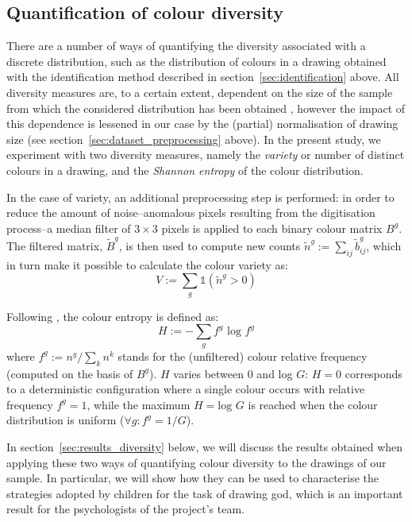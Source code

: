 \documentclass[11pt,a4paper]{article}
\begin{document}
\subsection{Quantification of colour diversity}
\label{sec:diversity}

There are a number of ways of quantifying the diversity associated with a discrete distribution, such as the distribution of colours in a drawing obtained with the identification method described in section~\ref{sec:identification} above. All diversity measures are, to a certain extent, dependent on the size of the sample from which the considered distribution has been obtained \cite[see e.g.][]{TweedieBaayen1998}, however the impact of this dependence is lessened in our case by the (partial) normalisation of drawing size (see section~\ref{sec:dataset_preprocessing} above). In the present study, we experiment with two diversity measures, namely the {\em variety} or number of distinct colours in a drawing, and the {\em Shannon entropy} of the colour distribution.

In the case of variety, an additional preprocessing step is performed: in order to reduce the amount of noise--anomalous pixels resulting from the digitisation process--a median filter of \(3 \times 3\) pixels is applied to each binary colour matrix $B^{g}$. The filtered matrix, $\tilde{B}^{g}$, is then used to compute new counts $\tilde{n}^{g} := \sum_{ij}\tilde{b}_{ij}^{g}$, which in turn make it possible to calculate the colour variety as:
\begin{equation}
	V := \sum_{g}\mathds{1}(\tilde{n}^{g} > 0)
\end{equation}

Following \citet{Shannon1948}, the colour entropy is defined as:
\begin{equation}
	H := -\sum_{g} f^{g}\mbox{ log }f^{g}
\end{equation}
where $f^{g}:= n^{g}/\sum_{k}n^{k}$ stands for the (unfiltered) colour relative frequency (computed on the basis of $B^{g}$). $H$ varies between 0 and log $G$: $H=0$ corresponds to a deterministic configuration where a single colour occurs with relative frequency $f^{g} = 1$, while the maximum $H=\mbox{log }G$ is reached when the colour distribution is uniform ($\forall g: f^{g} = 1/G$).

In section~\ref{sec:results_diversity} below, we will discuss the results obtained when applying these two ways of quantifying colour diversity to the drawings of our sample. In particular, we will show how they can be used to characterise the strategies adopted by children for the task of drawing god, which is an important result for the psychologists of the project's team.
\end{document}
